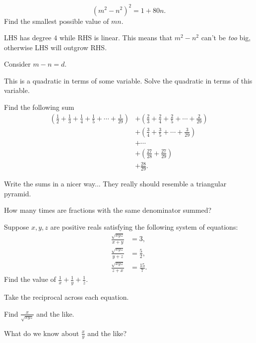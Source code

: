 \documentclass[../jarvis.tex]{subfiles}
\begin{document}
$$(m^2-n^2)^2=1+80n.$$
Find the smallest possible value of $mn$.
\begin{hints}
    \begin{hint}
        LHS has degree $4$ while RHS is linear. This means that $m^2-n^2$ can't be \textit{too} big, otherwise LHS will outgrow RHS.
    \end{hint}
    \begin{hint}
        Consider $m-n=d$.
    \end{hint}
    \begin{hint}
        This is a quadratic in terms of some variable. Solve the quadratic in terms of this variable.
    \end{hint}
\end{hints}
\problem[2014 SMO(J) P30]Find the following sum
\begin{align*}
    \left(\frac{1}{2}+\frac{1}{3}+\frac{1}{4}+\frac{1}{5}+\cdots+\frac{1}{29}\right)&+\left(\frac{2}{3}+\frac{2}{4}+\frac{2}{5}+\cdots+\frac{2}{29}\right) \\
    &+\left(\frac{3}{4}+\frac{3}{5}+\cdots+\frac{3}{29}\right) \\
    &+\cdots \\
    &+\left(\frac{27}{28}+\frac{27}{29}\right) \\
    &+\frac{28}{29}.
\end{align*}
\begin{hints}
    \begin{hint}
        Write the sums in a nicer way... They really should resemble a triangular pyramid.
    \end{hint}
    \begin{hint}
        How many times are fractions with the same denominator summed?
    \end{hint}
\end{hints}
\problem[2018 SMO(S) P25]Suppose $x,y,z$ are positive reals satisfying the following system of equations:
\begin{align*}
    \frac{\sqrt{xyz}}{x+y}&=3,\\
    \frac{\sqrt{xyz}}{y+z}&=\frac{5}{2},\\
    \frac{\sqrt{xyz}}{z+x}&=\frac{15}{7}.
\end{align*}
Find the value of $\frac{1}{x}+\frac{1}{y}+\frac{1}{z}.$
\begin{hints}
    \begin{hint}
        Take the reciprocal across each equation.
    \end{hint}
    \begin{hint}
        Find $\frac{x}{\sqrt{xyz}}$ and the like.
    \end{hint}
    \begin{hint}
        What do we know about $\frac{x}{y}$ and the like?
    \end{hint}
\end{hints}
\end{document}
